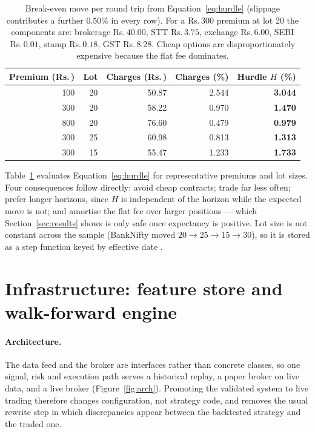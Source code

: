 \documentclass[10pt,a4paper]{article}
\newcommand{\rs}{Rs.\,}
\begin{document}
\begin{table}[H]
\centering\small
\begin{tabular}{@{}rrrrr@{}}
\toprule
\textbf{Premium (\rs)} & \textbf{Lot} & \textbf{Charges (\rs)} &
\textbf{Charges (\%)} & \textbf{Hurdle $H$ (\%)}\\
\midrule
100 & 20 & 50.87 & 2.544 & \textbf{3.044}\\
300 & 20 & 58.22 & 0.970 & \textbf{1.470}\\
800 & 20 & 76.60 & 0.479 & \textbf{0.979}\\
300 & 25 & 60.98 & 0.813 & \textbf{1.313}\\
300 & 15 & 55.47 & 1.233 & \textbf{1.733}\\
\bottomrule
\end{tabular}
\caption{Break-even move per round trip from Equation~\eqref{eq:hurdle}
(slippage contributes a further $0.50\%$ in every row). For a \rs$300$ premium
at lot 20 the components are: brokerage \rs$40.00$, STT \rs$3.75$, exchange
\rs$6.00$, SEBI \rs$0.01$, stamp \rs$0.18$, GST \rs$8.28$. Cheap options are
disproportionately expensive because the flat fee dominates.}
\label{tab:hurdle}
\end{table}

Table~\ref{tab:hurdle} evaluates Equation~\eqref{eq:hurdle} for representative
premiums and lot sizes. Four consequences follow directly: avoid cheap
contracts; trade far less often;
prefer longer horizons, since $H$ is independent of the horizon while the
expected move is not; and amortise the flat fee over larger positions --- which
Section~\ref{sec:results} shows is only safe once expectancy is positive.
Lot size is not constant across the sample (BankNifty moved $20\to25\to15\to30$),
so it is stored as a step function keyed by effective date \cite{nsecircular}.

\section{Infrastructure: feature store and walk-forward engine}\label{sec:infra}

\paragraph{Architecture.} The data feed and the broker are interfaces rather
than concrete classes, so one signal, risk and execution path serves a
historical replay, a paper broker on live data, and a live broker
(Figure~\ref{fig:arch}). Promoting the validated system to live trading
therefore changes configuration, not strategy code, and removes the usual
rewrite step in which discrepancies appear between the backtested strategy and
the traded one.
\end{document}
